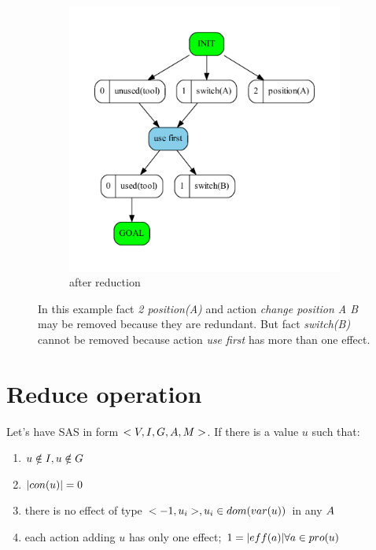 \begin{figure}
\begin{subfigure}[b]{0.4\textwidth}
			\includegraphics[scale=0.35]{deadEnds/figures/oneDeadEnd_output}
			\caption{after reduction}
		\end{subfigure}
		\caption{In this example fact \emph{2 position(A)} and action \emph{change position A B} may be removed because they are redundant. But fact \emph{switch(B)} cannot be removed because action \emph{use first} has more than one effect. }
	\end{figure}

	
	\section{Reduce operation}
	Let's have SAS in form $<V, I, G, A, M{}>$. If there is a value $u$ such that:
	
	\begin{enumerate}
		\item $u \notin I, u \notin G$
		\item $|con(u)| =  0$
		\item there is no effect of type $<-1,u_i>, u_i \in dom(var(u))$ in any $A{}$
		\item each action adding $u$ has only one effect; $1 = |eff(a)| \forall a \in pro(u)$	\label{de:in:invariants}
	\end{enumerate}

